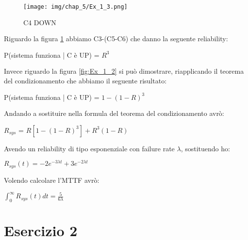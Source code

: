 \begin{figure}[H]
    \centering
    \texttt{[image: img/chap\_5/Ex\_1\_3.png]}
    \caption{C4 DOWN}
    \label{fig:Ex_1_3}
\end{figure}
\noindent
Riguardo la figura \ref{fig:Ex_1_3} abbiamo C3-(C5-C6) che danno la seguente reliability:
\begin{center}
 P(sistema funziona | C è UP) =  $R^3$
\end{center}
Invece riguardo la figura \ref{fig:Ex_1_2} si può dimostrare, riapplicando il teorema del condizionamento che abbiamo il seguente risultato:\\
\begin{center}
    P(sistema funziona | C è UP) =  $1-(1-R)^3$
\end{center}
Andando a sostituire nella formula del teorema del condizionamento avrò:\\
\begin{center}
     $R_{sys}$ = $R[1-(1-R)^3] + R^3(1-R)$
\end{center}
Avendo un reliability di tipo esponenziale con failure rate $\lambda$, sostituendo ho:\\
\begin{center}
    $R_{sys}(t) = -2e^{-3\lambda t } + 3e^{-2\lambda t}$
\end{center}
Volendo calcolare l'MTTF avrò:
\begin{center}
    $
        \int_0^{\infty} R_{sys}(t) dt = \frac{5}{6\lambda}
    $
\end{center}
\section{Esercizio 2}

